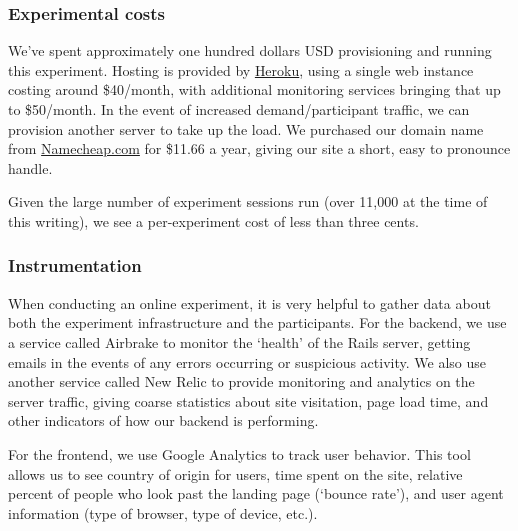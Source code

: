 \subsubsection{Experimental costs}

We've spent approximately one hundred dollars USD provisioning and running this experiment. Hosting is provided by \href{Heroku.com}{Heroku}, using a single web instance costing around \$40/month, with additional monitoring services bringing that up to \$50/month. In the event of increased demand/participant traffic, we can provision another server to take up the load.
We purchased our domain name from \href{Namecheap.com}{Namecheap.com} for \$11.66 a year, giving our site a short, easy to pronounce handle.


Given the large number of experiment sessions run (over 11,000 at the time of this writing), we see a per-experiment cost of less than three cents.

\subsubsection{Instrumentation}

When conducting an online experiment, it is very helpful to gather data about both the experiment infrastructure and the participants. For the backend, we use a service called Airbrake to monitor the `health' of the Rails server, getting emails in the events of any errors occurring or suspicious activity. We also use another service called New Relic to provide monitoring and analytics on the server traffic, giving coarse statistics about site visitation, page load time, and other indicators of how our backend is performing.

For the frontend, we use Google Analytics to track user behavior. This tool allows us to see country of origin for users, time spent on the site, relative percent of people who look past the landing page (`bounce rate'), and user agent information (type of browser, type of device, etc.).
